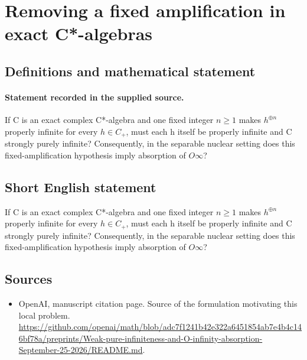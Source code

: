 \documentclass[11pt]{article}
\begin{document}
\section*{Removing a fixed amplification in exact C*-algebras}\label{statement}
\subsection{Definitions and mathematical statement}
\paragraph{Statement recorded in the supplied source.}
If C is an exact complex C*-algebra and one fixed integer $n\geq 1$ makes $h^{\oplus n}$ properly infinite for every $h\in C_+$, must each h itself be properly infinite and C strongly purely infinite? Consequently, in the separable nuclear setting does this fixed-amplification hypothesis imply absorption of $O\infty $?
\subsection{Short English statement}
If C is an exact complex C*-algebra and one fixed integer $n\geq 1$ makes $h^{\oplus n}$ properly infinite for every $h\in C_+$, must each h itself be properly infinite and C strongly purely infinite? Consequently, in the separable nuclear setting does this fixed-amplification hypothesis imply absorption of $O\infty $?
\subsection{Sources}
\begin{itemize}
\item[S1] OpenAI, manuscript citation page. Source of the formulation motivating this local problem.
\url{https://github.com/openai/math/blob/adc7f1241b42e322a6451854ab7e4b4c146bf78a/preprints/Weak-pure-infiniteness-and-O-infinity-absorption-September-25-2026/README.md}.
\end{itemize}
\end{document}
